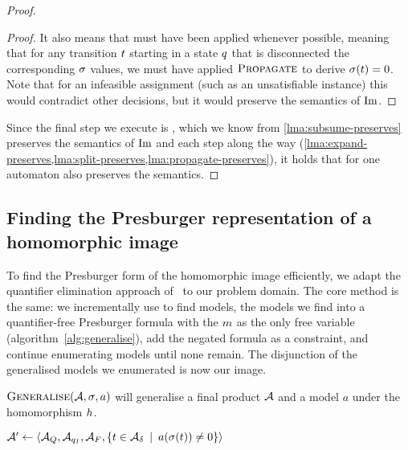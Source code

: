 \documentclass[acmsmall,review,anonymous,screen]{acmart}\settopmatter{printfolios=true,printccs=false,printacmref=true}
\theoremstyle{definition}
\begin{document}
\begin{proof}
\begin{proof}
  It also means that \Propagate{} must have been applied whenever possible, meaning that for any transition $t$ starting in a state $q$ that is disconnected the corresponding $\operatorname{\sigma}$ values, we must have applied $\textsc{Propagate}{}$ to derive $\operatorname{\sigma}(t) = 0$. Note that for an infeasible assignment (such as an unsatisfiable instance) this would contradict other decisions, but it would preserve the semantics of $\operatorname{Im}$.
\end{proof}

Since the final step we execute is \Subsume, which we know from
\cref{lma:subsume-preserves} preserves the semantics of $\operatorname{Im}$ and each step
along the way
(\cref{lma:expand-preserves,lma:split-preserves,lma:propagate-preserves}), it
holds that \Calculus{} for one automaton also preserves the semantics.
\end{proof}

\subsection{Finding the Presburger representation of a homomorphic image}\label{sec:finding-the-image}

To find the Presburger form of the homomorphic image efficiently, we adapt the
quantifier elimination approach of~\cite{qe} to our problem domain. The core
method is the same: we incrementally use \Calculus{} to find models,
\Generalise{} the models we find into a quantifier-free Presburger formula with
the $m$ as the only free variable (algorithm~\ref{alg:generalise}), add the
negated formula as a constraint, and continue enumerating models until none
remain. The disjunction of the generalised models we enumerated is now our
image.

\begin{algorithm}
  \caption{$\textsc{Generalise}{}(\mathcal{A}, \operatorname{\sigma}, a)$ will generalise a final product $\mathcal{A}$ and a model $a$ under the homomorphism $h$.}\label{alg:generalise}

  $\mathcal{A}' \gets \left\langle\mathcal{A}_Q, \mathcal{A}_{q_I}, \mathcal{A}_F, \left\{t \in \mathcal{A}_\delta \:\mid\: a(\operatorname{\sigma}(t)) \neq 0\right\}\right\rangle$


  \end{algorithm}
\end{document}
